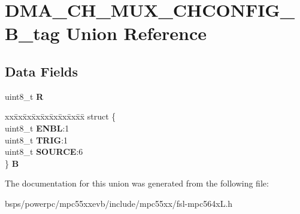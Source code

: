 \hypertarget{unionDMA__CH__MUX__CHCONFIG__8B__tag}{}\section{D\+M\+A\+\_\+\+C\+H\+\_\+\+M\+U\+X\+\_\+\+C\+H\+C\+O\+N\+F\+I\+G\+\_\+B\+\_\+tag Union Reference}
\label{unionDMA__CH__MUX__CHCONFIG__8B__tag}
\subsection*{Data Fields}
\begin{DoxyCompactItemize}
\item 
\mbox{\label{unionDMA__CH__MUX__CHCONFIG__8B__tag_ae73c9d89b1fb782e39eb87b6ccf63518}} 
uint8\+\_\+t {\bfseries R}
\item 
\mbox{\label{unionDMA__CH__MUX__CHCONFIG__8B__tag_afb8b9e868852d168220d72f715814e88}} 
\begin{tabbing}
xx\=xx\=xx\=xx\=xx\=xx\=xx\=xx\=xx\=\kill
struct \{\\
\>uint8\_t {\bfseries ENBL}:1\\
\>uint8\_t {\bfseries TRIG}:1\\
\>uint8\_t {\bfseries SOURCE}:6\\
\} {\bfseries B}\\

\end{tabbing}\end{DoxyCompactItemize}


The documentation for this union was generated from the following file\+:\begin{DoxyCompactItemize}
\item 
bsps/powerpc/mpc55xxevb/include/mpc55xx/fsl-\/mpc564x\+L.\+h\end{DoxyCompactItemize}
